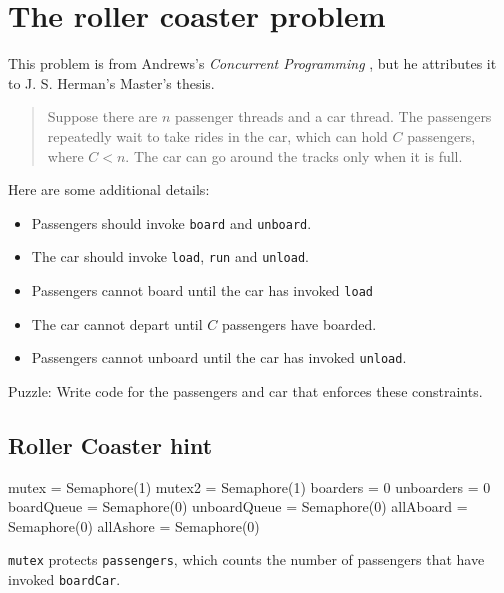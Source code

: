 \documentclass{book}
\begin{document}
\section{The roller coaster problem}

This problem is from Andrews's {\em Concurrent
Programming} \cite{andrews}, but he attributes it to J. S. Herman's
Master's thesis.

\begin {quotation}
Suppose there are $n$ passenger threads and a car thread.  The passengers
repeatedly wait to take rides in the car, which can hold $C$ passengers,
where $C<n$.  The car can go around the tracks only when it is full.
\end{quotation}

Here are some additional details:

\begin{itemize}

    \item Passengers should invoke {\tt board} and {\tt unboard}.

    \item The car should invoke {\tt load}, {\tt run} and {\tt unload}.

    \item Passengers cannot board until the car has invoked {\tt load}

    \item The car cannot depart until $C$ passengers have boarded.

    \item Passengers cannot unboard until the car
          has invoked {\tt unload}.

\end{itemize}

Puzzle: Write code for the passengers and car that enforces these
constraints.



\subsection{Roller Coaster hint}

\begin{unbreakable}[title={Roller Coaster hint}]{}
mutex = Semaphore(1)
mutex2 = Semaphore(1)
boarders = 0
unboarders = 0
boardQueue = Semaphore(0)
unboardQueue = Semaphore(0)
allAboard = Semaphore(0)
allAshore = Semaphore(0)
\end{unbreakable}

{\tt mutex} protects {\tt passengers}, which counts the number of
passengers that have invoked {\tt boardCar}.
\end{document}
